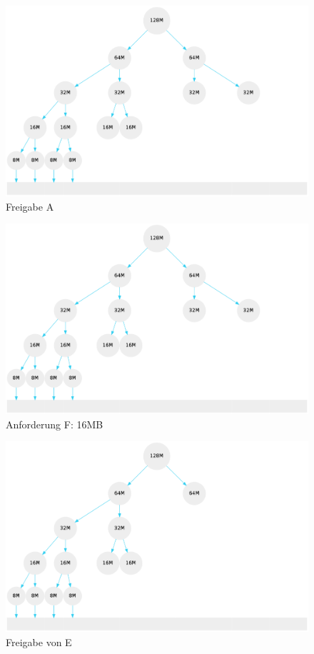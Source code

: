 \documentclass[11pt, a4paper]{scrartcl}
\begin{document}
\begin{figure}[H]
\center
\includegraphics[scale=0.32]{a1_4}
\caption{Freigabe A}
\end{figure}
\begin{figure}[H]
\center
\includegraphics[scale=0.32]{a1_4}
\caption{Anforderung F: 16MB}
\end{figure}
\begin{figure}[H]
\center
\includegraphics[scale=0.32]{a1_5}
\caption{Freigabe von E}
\end{figure}
\end{document}
